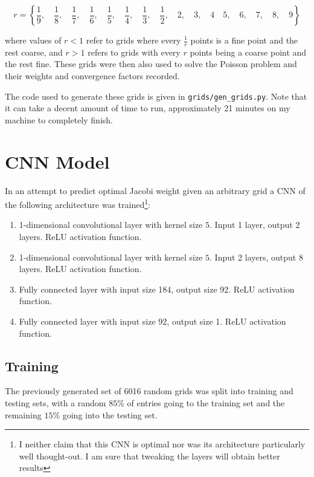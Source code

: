 $$r = \left\{
\frac{1}{9},\quad
\frac{1}{8},\quad
\frac{1}{7},\quad
\frac{1}{6},\quad
\frac{1}{5},\quad
\frac{1}{4},\quad
\frac{1}{3},\quad
\frac{1}{2},\quad
2,\quad
3,\quad
4\quad
5,\quad
6,\quad
7,\quad
8,\quad
9
\right\}$$

where values of $r<1$ refer to grids where every $\frac{1}{r}$ points is a fine point and the rest coarse, and $r>1$ refers to grids with every $r$ points being a coarse point and the rest fine.  These grids were then also used to solve the Poisson problem and their weights and convergence factors recorded.

The code used to generate these grids is given in \texttt{grids/gen\_grids.py}.  Note that it can take a decent amount of time to run, approximately 21 minutes on my machine to completely finish.

\section{CNN Model}

In an attempt to predict optimal Jacobi weight given an arbitrary grid a CNN of the following architecture was trained\footnote{I neither claim that this CNN is optimal nor was its architecture particularly well thought-out.  I am sure that tweaking the layers will obtain better results}:

\begin{enumerate}
\item 1-dimensional convolutional layer with kernel size $5$.  Input 1 layer, output 2 layers.  ReLU activation function.
\item 1-dimensional convolutional layer with kernel size $5$.  Input 2 layers, output 8 layers.  ReLU activation function.
\item Fully connected layer with input size 184, output size 92.  ReLU activation function.
\item Fully connected layer with input size 92, output size 1.  ReLU activation function.
\end{enumerate}

\subsection{Training}

The previously generated set of 6016 random grids was split into training and testing sets, with a random $85\%$ of entries going to the training set and the remaining $15\%$ going into the testing set.

